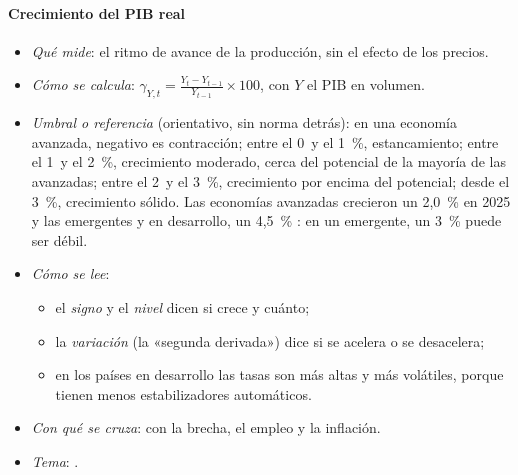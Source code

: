 \documentclass[11pt]{article}
\begin{document}
\paragraph{Crecimiento del PIB real}
\begin{itemize}
\item \emph{Qué mide}: el ritmo de avance de la producción, sin el efecto de los precios.
\item \emph{Cómo se calcula}: $\gamma_{Y,t}=\frac{Y_t-Y_{t-1}}{Y_{t-1}}\times100$, con $Y$ el PIB en volumen.
\item \emph{Umbral o referencia} (orientativo, sin norma detrás): en una economía avanzada, negativo es contracción; entre el 0~y el 1~\%, estancamiento; entre el 1~y el 2~\%, crecimiento moderado, cerca del potencial de la mayoría de las avanzadas; entre el 2~y el 3~\%, crecimiento por encima del potencial; desde el 3~\%, crecimiento sólido. Las economías avanzadas crecieron un 2,0~\% en 2025 y las emergentes y en desarrollo, un 4,5~\% \parencite{FMI2026WEO}: en un emergente, un 3~\% puede ser débil.
\item \emph{Cómo se lee}:
  \begin{itemize}
  \item el \emph{signo} y el \emph{nivel} dicen si crece y cuánto;
  \item la \emph{variación} (la «segunda derivada») dice si se acelera o se desacelera;
  \item en los países en desarrollo las tasas son más altas y más volátiles, porque tienen menos estabilizadores automáticos.
  \end{itemize}
\item \emph{Con qué se cruza}: con la brecha, el empleo y la inflación.
\item \emph{Tema}:  .
\end{itemize}
\end{document}
